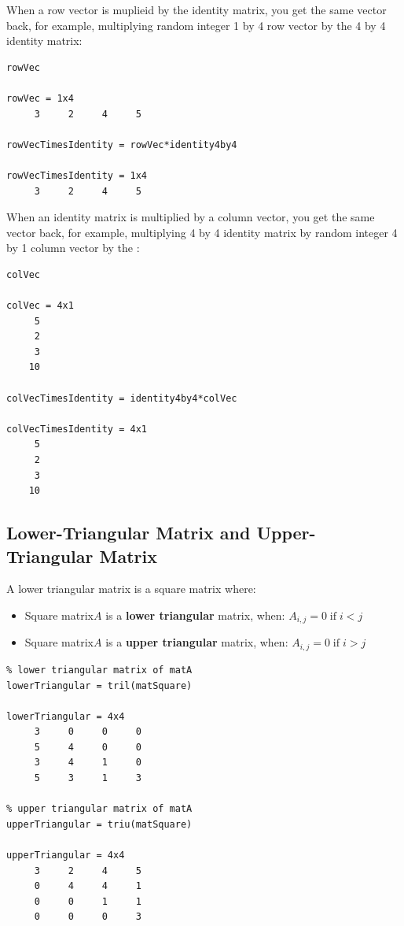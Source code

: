 \documentclass[
]{book}
\begin{document}
When a row vector is muplieid by the identity matrix, you get the same
vector back, for example, multiplying random integer 1 by 4 row vector
by the 4 by 4 identity matrix:

\begin{verbatim}
rowVec

rowVec = 1x4    
     3     2     4     5

rowVecTimesIdentity = rowVec*identity4by4

rowVecTimesIdentity = 1x4    
     3     2     4     5
\end{verbatim}

When an identity matrix is multiplied by a column vector, you get the
same vector back, for example, multiplying 4 by 4 identity matrix by
random integer 4 by 1 column vector by the :

\begin{verbatim}
colVec

colVec = 4x1    
     5
     2
     3
    10

colVecTimesIdentity = identity4by4*colVec

colVecTimesIdentity = 4x1    
     5
     2
     3
    10
\end{verbatim}

\hypertarget{lower-triangular-matrix-and-upper-triangular-matrix}{%
\subsection{Lower-Triangular Matrix and Upper-Triangular Matrix}\label{lower-triangular-matrix-and-upper-triangular-matrix}}

A lower triangular matrix is a square matrix where:

\begin{itemize}
\item
  Square matrix\(A\) is a \textbf{lower triangular} matrix, when:
  \(A_{i,j} =0\;\textrm{if}\;i<j\)
\item
  Square matrix\(A\) is a \textbf{upper triangular} matrix, when:
  \(A_{i,j} =0\;\textrm{if}\;i>j\)
\end{itemize}

\begin{verbatim}
% lower triangular matrix of matA 
lowerTriangular = tril(matSquare)

lowerTriangular = 4x4    
     3     0     0     0
     5     4     0     0
     3     4     1     0
     5     3     1     3

% upper triangular matrix of matA 
upperTriangular = triu(matSquare)

upperTriangular = 4x4    
     3     2     4     5
     0     4     4     1
     0     0     1     1
     0     0     0     3
\end{verbatim}
\end{document}

